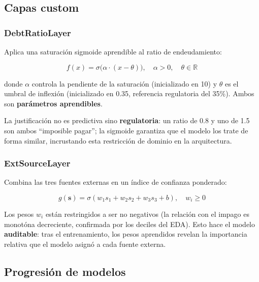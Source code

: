 \documentclass[12pt,a4paper]{article}
\begin{document}
\subsection{Capas custom}

\subsubsection{DebtRatioLayer}

Aplica una saturación sigmoide aprendible al ratio de endeudamiento:

\begin{equation}
    f(x) = \sigma\bigl(\alpha \cdot (x - \theta)\bigr), \quad
    \alpha > 0, \quad \theta \in \mathbb{R}
    \label{eq:debt_layer}
\end{equation}

donde $\alpha$ controla la pendiente de la saturación (inicializado en 10)
y $\theta$ es el umbral de inflexión (inicializado en 0.35, referencia
regulatoria del 35\%). Ambos son \textbf{parámetros aprendibles}.

La justificación no es predictiva sino \textbf{regulatoria}: un ratio de
0.8 y uno de 1.5 son ambos ``imposible pagar''; la sigmoide garantiza que
el modelo los trate de forma similar, incrustando esta restricción de dominio
en la arquitectura.

\subsubsection{ExtSourceLayer}

Combina las tres fuentes externas en un índice de confianza ponderado:

\begin{equation}
    g(\mathbf{s}) = \sigma(w_1 s_1 + w_2 s_2 + w_3 s_3 + b),
    \quad w_i \geq 0
    \label{eq:ext_layer}
\end{equation}

Los pesos $w_i$ están restringidos a ser no negativos (la relación con el
impago es monotóna decreciente, confirmada por los deciles del EDA).
Esto hace el modelo \textbf{auditable}: tras el entrenamiento, los pesos
aprendidos revelan la importancia relativa que el modelo asignó a cada
fuente externa.

\subsection{Progresión de modelos}
\end{document}
